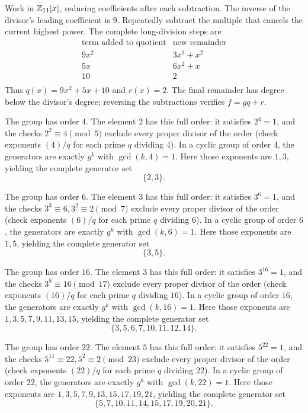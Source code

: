 Work in $\mathbb{Z}_{11}[x]$, reducing coefficients after each subtraction. The inverse of the divisor's leading coefficient is $9$. Repeatedly subtract the multiple that cancels the current highest power. The complete long-division steps are
\[
\begin{array}{c|l}
\text{term added to quotient}&\text{new remainder}\\\hline
9x^2&3x^3+x^2\\
5x&6x^2+x\\
10&2\\
\end{array}
\]
Thus $\boxed{q(x)=9x^2+5x+10}$ and $\boxed{r(x)=2}$. The final remainder has degree below the divisor's degree; reversing the subtractions verifies $f=gq+r$.

The group has order $4$. The element $2$ has this full order: it satisfies $2^{4}=1$, and the checks $2^{2}\equiv4\pmod{5}$ exclude every proper divisor of the order (check exponents $(4)/q$ for each prime $q$ dividing $4$). In a cyclic group of order $4$, the generators are exactly $g^k$ with $\gcd(k,4)=1$. Here those exponents are $1,3$, yielding the complete generator set
\[\boxed{\{2,3\}}.
\]

The group has order $6$. The element $3$ has this full order: it satisfies $3^{6}=1$, and the checks $3^{3}\equiv6, 3^{2}\equiv2\pmod{7}$ exclude every proper divisor of the order (check exponents $(6)/q$ for each prime $q$ dividing $6$). In a cyclic group of order $6$, the generators are exactly $g^k$ with $\gcd(k,6)=1$. Here those exponents are $1,5$, yielding the complete generator set
\[\boxed{\{3,5\}}.
\]

The group has order $16$. The element $3$ has this full order: it satisfies $3^{16}=1$, and the checks $3^{8}\equiv16\pmod{17}$ exclude every proper divisor of the order (check exponents $(16)/q$ for each prime $q$ dividing $16$). In a cyclic group of order $16$, the generators are exactly $g^k$ with $\gcd(k,16)=1$. Here those exponents are $1,3,5,7,9,11,13,15$, yielding the complete generator set
\[\boxed{\{3,5,6,7,10,11,12,14\}}.
\]

The group has order $22$. The element $5$ has this full order: it satisfies $5^{22}=1$, and the checks $5^{11}\equiv22, 5^{2}\equiv2\pmod{23}$ exclude every proper divisor of the order (check exponents $(22)/q$ for each prime $q$ dividing $22$). In a cyclic group of order $22$, the generators are exactly $g^k$ with $\gcd(k,22)=1$. Here those exponents are $1,3,5,7,9,13,15,17,19,21$, yielding the complete generator set
\[\boxed{\{5,7,10,11,14,15,17,19,20,21\}}.
\]

